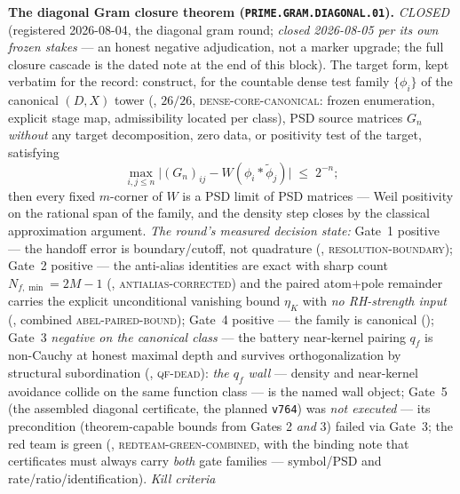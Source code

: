 \par\smallskip\noindent\textbf{The diagonal Gram closure theorem
(\texttt{PRIME.GRAM.DIAGONAL.01}).}
{\sloppy
\emph{CLOSED} (registered 2026-08-04, the diagonal gram round;
\emph{closed 2026-08-05 per its own frozen stakes} --- an honest
negative adjudication, not a marker upgrade; the full closure
cascade is the dated note at the end of this block).  The target
form, kept verbatim for the record:
construct, for the countable dense test family $\{\phi_i\}$ of the
canonical $(D,X)$ tower (, $26/26$,
\textsc{dense-core-canonical}: frozen enumeration, explicit stage
map, admissibility located per class), PSD source matrices $G_n$
\emph{without} any target decomposition, zero data, or positivity
test of the target, satisfying
\[
  \max_{i,j\le n}\bigl|(G_n)_{ij}-W(\phi_i\ast\tilde\phi_j)\bigr|
  \;\le\; 2^{-n};
\]
then every fixed $m$-corner of $W$ is a PSD limit of PSD matrices
--- Weil positivity on the rational span of the family, and the
density step closes by the classical approximation argument.
\emph{The round's measured decision state:} Gate~1 positive ---
the handoff error is boundary/cutoff, not quadrature
(,
\textsc{resolution-boundary}); Gate~2 positive --- the anti-alias
identities are exact with sharp count $N_{f,\min}=2M{-}1$
(, \textsc{antialias-corrected})
and the paired atom$+$pole remainder carries the explicit
unconditional vanishing bound $\eta_K$ with \emph{no RH-strength
input} (, combined
\textsc{abel-paired-bound}); Gate~4 positive --- the family is
canonical (); Gate~3
\emph{negative on the canonical class} --- the battery near-kernel
pairing $q_f$ is non-Cauchy at honest maximal depth and survives
orthogonalization by structural subordination
(, \textsc{qf-dead}): \emph{the
$q_f$ wall} --- density and near-kernel avoidance collide on the
same function class --- is the named wall object; Gate~5 (the
assembled diagonal certificate, the planned \texttt{v764}) was
\emph{not executed} --- its precondition (theorem-capable bounds
from Gates 2 \emph{and} 3) failed via Gate~3; the red team is green
(,
\textsc{redteam-green-combined}, with the binding note that
certificates must always carry \emph{both} gate families ---
symbol/PSD and rate/ratio/identification).  \emph{Kill criteria
}}

